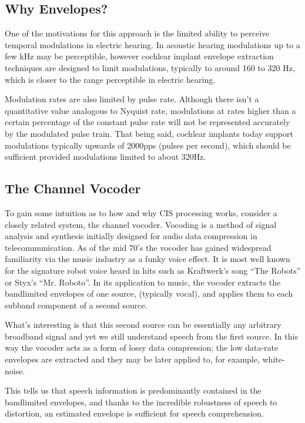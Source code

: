 \documentclass [11pt, proquest,oneside] {ganter_thesis}[2015/03/03]
\begin{document}
\subsection{Why Envelopes?}

One of the motivations for this approach is the limited ability to perceive temporal modulations in electric hearing.  In acoustic hearing modulations up to a few kHz may be perceptible, however cochlear implant envelope extraction techniques are designed to limit modulations, typically to around 160 to 320 Hz, which is closer to the range perceptible in electric hearing.

Modulation rates are also limited by pulse rate.  Although there isn't a quantitative value analogous to Nyquist rate, modulations at rates higher than a certain percentage of the constant pulse rate will not be represented accurately by the modulated pulse train.  That being said, cochlear implants today support modulations typically upwards of 2000pps (pulses per second), which should be sufficient provided modulations limited to about 320Hz.

\subsection{The Channel Vocoder}

To gain some intuition as to how and why CIS processing works, consider a closely related system, the channel vocoder.  Vocoding is a method of signal analysis and synthesis initially designed for audio data compression in telecommunication.  As of the mid 70's the vocoder has gained widespread familiarity via the music industry as a funky voice effect.  It is most well known for the signature robot voice heard in hits such as Kraftwerk's song ``The Robots'' or Styx's ``Mr. Roboto''.  In its application to music, the vocoder extracts the bandlimited envelopes of one source, (typically vocal), and applies them to each subband component of a second source.

What's interesting is that this second source can be essentially any arbitrary broadband signal and yet we still understand speech from the first source.  In this way the vocoder acts as a form of lossy data compression; the low data-rate envelopes are extracted and they may be later applied to, for example, white-noise.

This tells us that speech information is predominantly contained in the bandlimited envelopes, and thanks to the incredible robustness of speech to distortion, an estimated envelope is sufficient for speech comprehension.
\end{document}
